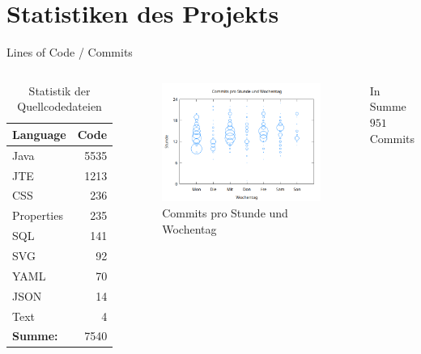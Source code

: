 \documentclass{sdqbeamer}
\begin{document}
\section{Statistiken des Projekts}

\begin{frame}{Lines of Code / Commits}
    \begin{columns}
         \begin{table}[h]
    \centering
    \begin{tabular}{lr}
        \toprule
        Language & Code \\
        \midrule
        Java        & 5535 \\
        JTE        & 1213 \\
        CSS         & 236  \\
        Properties  & 235  \\
        SQL        & 141  \\
        SVG        & 92   \\
        YAML       & 70   \\
        JSON       & 14   \\
        Text       & 4    \\
        \midrule
        \textbf{Summe:} & 7540 \\
        \bottomrule
    \end{tabular}
    \caption{Statistik der Quellcodedateien}
    \label{tab:code_stats}
\end{table}
    \begin{figure}
        \centering
        \includegraphics[width=1\linewidth]{hours.png}
        \caption{Commits pro Stunde und Wochentag}
        \label{fig:enter-label}
    \end{figure}
    In Summe $951$ Commits
    \hfill \break
    \hfill \break
    \hfill \break
    \hfill \break
    \end{columns}
  
\end{frame}
\end{document}
